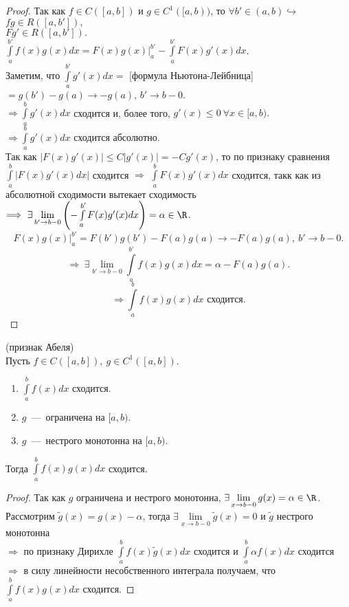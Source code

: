 \begin{proof}
    Так как $f \in C([a, b])$ и $g \in C^1([a, b))$, то $\forall b' \in (a, b) \hookrightarrow$  \\ $ fg \in R([a, b']),$ \\ $F g' \in R([a, b']).$ \\
    $\int \limits_a^{b'} f(x) g(x) dx = F(x)g(x) \bigg|_a^{b'} - \int \limits_a^{b'} F(x) g'(x) dx$. \\
    Заметим, что $\int \limits_a^{b'} g'(x) dx =$ [формула Ньютона-Лейбница] $= g(b') - g(a) \to -g(a)$, $b' \to b - 0.$ \\
    $\Longrightarrow \int \limits_a^b g'(x) dx$ сходится и, более того, $g'(x) \leq 0 \ \forall x \in [a, b).$ \\
    $\Longrightarrow \int \limits_a^b g'(x) dx$ сходится абсолютно. \\
    Так как $\left| F(x) g'(x)\right| \leq C|g'(x)| = -C g'(x)$, то по признаку сравнения $\int \limits_a^b \left| F(x)g'(x)dx \right|$ сходится $\Longrightarrow $ $\int \limits_a^b F(x)g'(x)dx$ сходится, такк как из абсолютной сходимости вытекает сходимость $\Longrightarrow \ \exists \lim \limits_{b' \to b - 0} \left( - \int \limits_a^{b'} F(x)g'(x) dx \right) = \alpha \in \R$. \\
    $$F(x) g(x) \bigg|_a^{b'} = F(b')g(b') - F(a)g(a) \to -F(a)g(a), \ b' \to b - 0.$$
    $$\Longrightarrow \ \exists \lim \limits_{b' \to b - 0} \int \limits_a^{b'} f(x) g(x) dx = \alpha - F(a)g(a).$$
    $$\Longrightarrow \int \limits_a^b f(x) g(x) dx \text{ сходится}.$$
\end{proof}

\begin{theorem} (признак Абеля) \\
    Пусть $f \in C([a, b]), \ g \in C^1([a, b])$. \\
    \begin{enumerate}
    \item $\int \limits_a^b f(x) dx$ сходится. \\
    \item $g$~---~ограничена на $[a, b).$
    \item $g$~---~нестрого монотонна на $[a, b)$.
    \end{enumerate}
    Тогда $\int \limits_a^b f(x) g(x) dx$ сходится.
\end{theorem}

\begin{proof}
     Так как $g$ ограничена и нестрого монотонна, $\exists \lim \limits_{x \to b - 0} g(x) = \alpha \in \R$.
     Рассмотрим $\widetilde{g}(x) = g(x) - \alpha$, тогда $\exists \lim \limits_{x \to b - 0} \widetilde{g}(x) = 0$ и $\widetilde{g}$ нестрого монотонна \\
     $\Longrightarrow$ по признаку Дирихле $\int \limits_a^b f(x) \widetilde g(x) dx$ сходится и $\int \limits_a^b \alpha f(x) dx$ сходится $\Longrightarrow$ в силу линейности несобственного интеграла получаем, что $\int \limits_a^b f(x) g(x) dx$ сходится.
\end{proof}